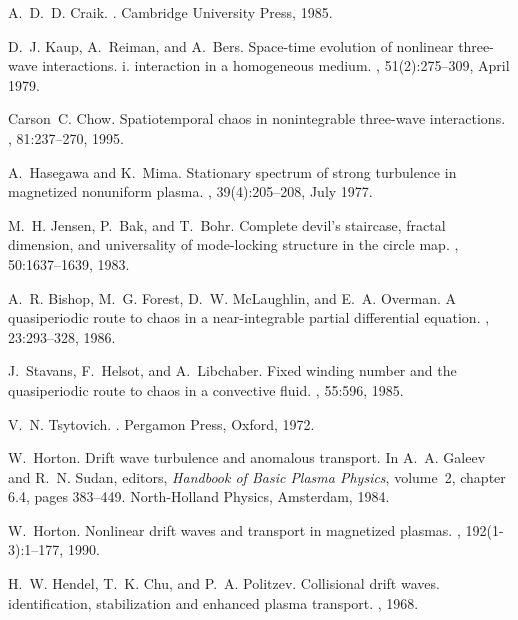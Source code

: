 \begin{thebibliography}{10}

A.~D.~D. Craik.
.
\newblock Cambridge University Press, 1985.

D.~J. Kaup, A.~Reiman, and A.~Bers.
\newblock Space-time evolution of nonlinear three-wave interactions. i.
  interaction in a homogeneous medium.
, 51(2):275--309, April 1979.

Carson~C. Chow.
\newblock Spatiotemporal chaos in nonintegrable three-wave interactions.
, 81:237--270, 1995.

A.~Hasegawa and K.~Mima.
\newblock Stationary spectrum of strong turbulence in magnetized nonuniform
  plasma.
, 39(4):205--208, July 1977.

M.~H. Jensen, P.~Bak, and T.~Bohr.
\newblock Complete devil's staircase, fractal dimension, and universality of
  mode-locking structure in the circle map.
, 50:1637--1639, 1983.

A.~R. Bishop, M.~G. Forest, D.~W. McLaughlin, and E.~A. Overman.
\newblock A quasiperiodic route to chaos in a near-integrable partial
  differential equation.
, 23:293--328, 1986.

J.~Stavans, F.~Helsot, and A.~Libchaber.
\newblock Fixed winding number and the quasiperiodic route to chaos in a
  convective fluid.
, 55:596, 1985.

V.~N. Tsytovich.
.
\newblock Pergamon Press, Oxford, 1972.

W.~Horton.
\newblock Drift wave turbulence and anomalous transport.
\newblock In A.~A. Galeev and R.~N. Sudan, editors, {\em Handbook of Basic
  Plasma Physics}, volume~2, chapter 6.4, pages 383--449. North-Holland
  Physics, Amsterdam, 1984.

W.~Horton.
\newblock Nonlinear drift waves and transport in magnetized plasmas.
, 192(1-3):1--177, 1990.

H.~W. Hendel, T.~K. Chu, and P.~A. Politzev.
\newblock Collisional drift waves. identification, stabilization and enhanced
  plasma transport.
, 1968.


\end{thebibliography}
